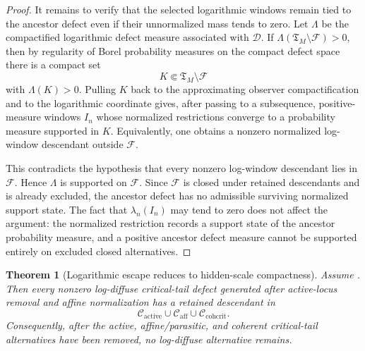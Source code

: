 \documentclass[11pt]{amsart}
\numberwithin{equation}{section}
\theoremstyle{plain}
\newtheorem{theorem}{Theorem}[section]
\theoremstyle{definition}
\theoremstyle{remark}
\newcommand{\Cactive}{\mathcal C_{\mathrm{active}}}
\newcommand{\Caff}{\mathcal C_{\mathrm{aff}}}
\newcommand{\Ccohcrit}{\mathcal C_{\mathrm{cohcrit}}}
\newcommand{\Tcrit}{\mathfrak T_M}
\begin{document}
\begin{proof}
It remains to verify that the selected logarithmic windows remain tied to the
ancestor defect even if their unnormalized mass tends to zero.
Let \(\Lambda\) be the compactified logarithmic defect measure associated with
\(\mathcal D\).  If \(\Lambda(\Tcrit\setminus\mathcal F)>0\), then by
regularity of Borel probability measures on the compact defect space there is a
compact set
\[
   K\Subset \Tcrit\setminus\mathcal F
\]
with \(\Lambda(K)>0\).  Pulling \(K\) back to the approximating observer
compactification and to the logarithmic coordinate gives, after passing to a
subsequence, positive-measure windows \(I_n\) whose normalized restrictions
converge to a probability measure supported in \(K\).  Equivalently, one obtains
a nonzero normalized log-window descendant outside \(\mathcal F\).

This contradicts the hypothesis that every nonzero log-window descendant lies
in \(\mathcal F\).  Hence \(\Lambda\) is supported on \(\mathcal F\).  Since
\(\mathcal F\) is closed under retained descendants and is already excluded,
the ancestor defect has no admissible surviving normalized support state.  The
fact that \(\lambda_n(I_n)\) may tend to zero does not affect the argument: the normalized
restriction records a support state of the ancestor probability measure, and a
positive ancestor defect measure cannot be supported entirely on excluded
closed alternatives.
\end{proof}

\begin{theorem}[Logarithmic escape reduces to hidden-scale compactness]
\label{thm:log-diffuse-from-hidden-scale}
Assume .  Then every
nonzero log-diffuse critical-tail defect generated after active-locus removal
and affine normalization has a retained descendant in
\[
   \Cactive\cup\Caff\cup\Ccohcrit .
\]
Consequently, after the active, affine/parasitic, and coherent critical-tail
alternatives have been removed, no log-diffuse alternative remains.
\end{theorem}
\end{document}
